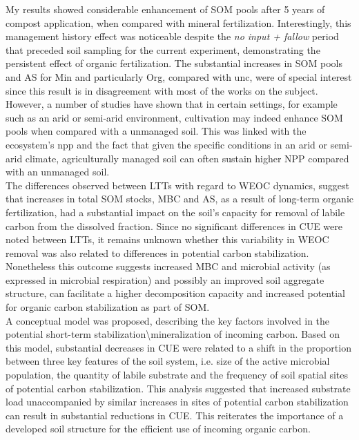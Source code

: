 	My results showed considerable enhancement of SOM pools after 5 years of compost application, when compared with mineral fertilization. Interestingly, this management history effect was noticeable despite the \textit{no input + fallow} period that preceded soil sampling for the current experiment, demonstrating the persistent effect of organic fertilization. The substantial increases in SOM pools and AS for Min and particularly Org, compared with \gls{unc}, were of special interest since this result is in disagreement with most  of the works on the subject. However, a number of studies have shown that in certain settings, for example such as an arid or semi-arid environment, cultivation may indeed enhance SOM pools when compared with a unmanaged soil. This was linked with the ecosystem's \gls{npp} and the fact that given the specific conditions in an arid or semi-arid climate, agriculturally managed soil can often sustain higher NPP compared with an unmanaged soil.\\
	The differences observed between LTTs with regard to WEOC dynamics, suggest that increases in total SOM stocks, MBC and AS, as a result of long-term organic fertilization, had a substantial impact on the soil's capacity for removal of labile carbon from the dissolved fraction. Since no significant differences in CUE were noted between LTTs, it remains unknown whether this variability in WEOC removal was also related to differences in potential carbon stabilization. Nonetheless this outcome suggests increased MBC and microbial activity (as expressed in microbial respiration) and possibly an improved soil aggregate structure, can facilitate a higher decomposition capacity and increased potential for organic carbon stabilization as part of SOM.\\
	A conceptual model was proposed, describing the key factors involved in the potential short-term stabilization\textbackslash mineralization of incoming carbon. Based on this model, substantial decreases in CUE were related to a shift in the proportion between three key features of the soil system, i.e. size of the active microbial population, the quantity of labile substrate and the frequency of soil spatial sites of potential carbon stabilization. This analysis suggested that increased substrate load unaccompanied by similar increases in sites of potential carbon stabilization can result in substantial reductions in CUE. This reiterates the importance of a developed soil structure for the efficient use of incoming organic carbon.\\
